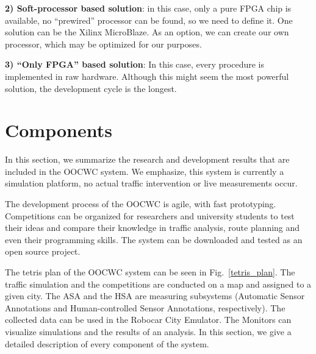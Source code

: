 \documentclass[b5paper,12pt]{report}
\theoremstyle{definition}
\begin{document}
{\bf{2) Soft-processor based solution}}: in this case, only a pure FPGA chip is available, no \enquote{prewired} processor can be found, so we need to define it. One solution can be the Xilinx MicroBlaze. As an option, we can create our own processor, which may be optimized for our purposes.

{\bf{3) \enquote{Only FPGA} based solution}}: In this case, every procedure is implemented in raw hardware. Although this might seem the most powerful solution, the development cycle is the longest.

\section{Components}
\label{components
}
In this section, we summarize the research and development results that are included in the OOCWC system. We emphasize, this system is currently a simulation platform, no actual traffic intervention or live measurements occur.

The development process of the OOCWC is agile, with fast prototyping. Competitions can be organized for researchers and university students to test their ideas and compare their knowledge in traffic analysis, route planning and even their programming skills. The system can be downloaded and tested as an open source project. \cite{csts-repo}

The tetris plan of the OOCWC system can be seen in Fig.~\ref{tetris_plan}. The traffic simulation and the competitions are conducted on a map and assigned to a given city. The ASA and the HSA are measuring subsystems (Automatic Sensor Annotations and Human-controlled Sensor Annotations, respectively). The collected data can be used in the Robocar City Emulator. The Monitors can visualize simulations and the results of an analysis. In this section, we give a detailed description of every component of the system.
\end{document}
